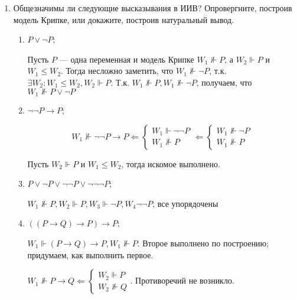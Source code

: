 \begin{enumerate}[wide, labelwidth=!, labelindent=0pt]
      \item Общезначимы ли следующие высказывания в ИИВ? Опровергните, построив модель Крипке, или докажите, построив натуральный вывод.
            \begin{enumerate}[wide, labelwidth=!, labelindent=0pt]
                  \item $P \vee \neg P$;

                        Пусть \(P\) --- одна переменная и модель Крипке \(W_1 \nVdash P\), а \(W_2 \Vdash P\) и \(W_1 \leq W_2\). Тогда несложно заметить, что \(W_1 \nVdash \neg P\), т.к. \(\exists W_2 : W_1 \leq W_2, W_2 \Vdash P\). Т.к. \(W_1 \nVdash P, W_1 \nVdash \neg P\), получаем, что \(W_1 \nVdash P \lor \neg P\)

                  \item $\neg\neg P \rightarrow P$;

                        \[W_1 \nVdash \neg\neg P \rightarrow P \Leftarrow \begin{cases}
                                    W_1 \Vdash \neg \neg P \\
                                    W_1 \nVdash P
                              \end{cases} \Leftarrow \begin{cases}
                                    W_1 \nVdash \neg P \\
                                    W_1 \nVdash P
                              \end{cases}\]

                        Пусть \(W_2 \Vdash P\) и \(W_1 \leq W_2\), тогда искомое выполнено.

                  \item $P \vee \neg P \vee \neg\neg P \vee \neg\neg\neg P$;

                        \(W_1 \nVdash P, W_2 \Vdash P, W_3 \Vdash \neg P, W_4 \neg \neg P\), все упорядочены

                  \item $((P \rightarrow Q) \rightarrow P) \rightarrow P$;

                        \(W_1 \Vdash (P \to Q) \to P, W_1 \nVdash P\). Второе выполнено по построению; придумаем, как выполнить первое.

                        \(W_1 \nVdash P \to Q \Leftarrow \begin{cases}
                              W_2 \Vdash P \\
                              W_2 \nVdash Q
                        \end{cases}\). Противоречий не возникло.


\end{enumerate}
\end{enumerate}
